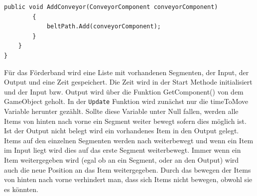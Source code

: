 \begin{lstlisting}[style=code, caption={Förderband Komponente OOP}]
        public void AddConveyor(ConveyorComponent conveyorComponent)
        {
            beltPath.Add(conveyorComponent);
        }
    }
}
\end{lstlisting}
Für das Förderband wird eine Liste mit vorhandenen Segmenten, der Input, der Output und eine Zeit gespeichert. Die Zeit wird in der Start Methode initialisiert und der Input bzw. Output wird über die Funktion \glqq GetComponent()\grqq{} von dem GameObject geholt. In der \texttt{Update} Funktion wird zunächst nur die timeToMove Variable herunter gezählt. Sollte diese Variable unter Null fallen, werden alle Items von hinten nach vorne ein Segment weiter bewegt sofern dies möglich ist. Ist der Output nicht belegt wird ein vorhandenes Item in den Output gelegt. Items auf den einzelnen Segmenten werden nach weiterbewegt und wenn ein Item im Input liegt wird dies auf das erste Segment weiterbewegt. Immer wenn ein Item weitergegeben wird (egal ob an ein Segment, oder an den Output) wird auch die neue Position an das Item weitergegeben. Durch das bewegen der Items von hinten nach vorne verhindert man, dass sich Items nicht bewegen, obwohl sie es könnten.
